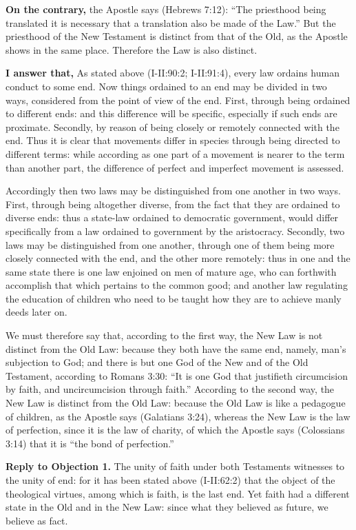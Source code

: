 \textbf{On the contrary,} the Apostle says (Hebrews 7:12): ``The priesthood being translated it is necessary that a translation also be made of the Law.'' But the priesthood of the New Testament is distinct from that of the Old, as the Apostle shows in the same place. Therefore the Law is also distinct.

\textbf{I answer that,} As stated above (I-II:90:2; I-II:91:4), every law ordains human conduct to some end. Now things ordained to an end may be divided in two ways, considered from the point of view of the end. First, through being ordained to different ends: and this difference will be specific, especially if such ends are proximate. Secondly, by reason of being closely or remotely connected with the end. Thus it is clear that movements differ in species through being directed to different terms: while according as one part of a movement is nearer to the term than another part, the difference of perfect and imperfect movement is assessed.

Accordingly then two laws may be distinguished from one another in two ways. First, through being altogether diverse, from the fact that they are ordained to diverse ends: thus a state-law ordained to democratic government, would differ specifically from a law ordained to government by the aristocracy. Secondly, two laws may be distinguished from one another, through one of them being more closely connected with the end, and the other more remotely: thus in one and the same state there is one law enjoined on men of mature age, who can forthwith accomplish that which pertains to the common good; and another law regulating the education of children who need to be taught how they are to achieve manly deeds later on.

We must therefore say that, according to the first way, the New Law is not distinct from the Old Law: because they both have the same end, namely, man's subjection to God; and there is but one God of the New and of the Old Testament, according to Romans 3:30: ``It is one God that justifieth circumcision by faith, and uncircumcision through faith.'' According to the second way, the New Law is distinct from the Old Law: because the Old Law is like a pedagogue of children, as the Apostle says (Galatians 3:24), whereas the New Law is the law of perfection, since it is the law of charity, of which the Apostle says (Colossians 3:14) that it is ``the bond of perfection.''

\textbf{Reply to Objection 1.} The unity of faith under both Testaments witnesses to the unity of end: for it has been stated above (I-II:62:2) that the object of the theological virtues, among which is faith, is the last end. Yet faith had a different state in the Old and in the New Law: since what they believed as future, we believe as fact.

